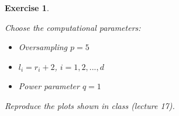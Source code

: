 \documentclass[11pt]{article}
\newtheorem{exercise}[theorem]{Exercise}
\begin{document}
\begin{exercise}
\begin{itemize}
Choose the computational parameters:\vspace{-3mm}
\begin{itemize}
\item[$\bullet$] Oversampling $p = 5$  \vspace{-1.5mm}
\item[$\bullet$] $l_i = r_i+2$, $i= 1, 2, . . . , d$ \vspace{-1.5mm}
\item[$\bullet$] Power parameter $q=1$
\end{itemize}
Reproduce the plots shown in class (lecture 17). 
\end{itemize}

\end{exercise}
\end{document}
